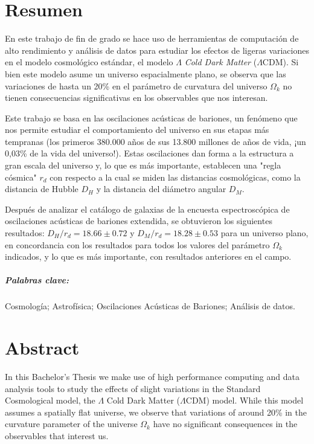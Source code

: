 \chapter*{Resumen}

En este trabajo de fin de grado se hace uso de herramientas de computación de alto rendimiento y análisis de datos para estudiar los efectos de ligeras variaciones en el modelo cosmológico estándar, el modelo $\Lambda$ \textit{Cold Dark Matter} ($\Lambda$CDM). Si bien este modelo asume un universo espacialmente plano, se observa que las variaciones de hasta un 20\% en el parámetro de curvatura del universo $\Omega_k$ no tienen consecuencias significativas en los observables que nos interesan.

Este trabajo se basa en las oscilaciones acústicas de bariones, un fenómeno que nos permite estudiar el comportamiento del universo en sus etapas más tempranas (los primeros 380.000 años de sus 13.800 millones de años de vida, ¡un 0,03\% de la vida del universo!). Estas oscilaciones dan forma a la estructura a gran escala del universo y, lo que es más importante, establecen una "regla cósmica" $r_d$ con respecto a la cual se miden las distancias cosmológicas, como la distancia de Hubble $D_H$ y la distancia del diámetro angular $D_M$.

Después de analizar el catálogo de galaxias de la encuesta espectroscópica de oscilaciones acústicas de bariones extendida, se obtuvieron los siguientes resultados: $D_H/r_d = 18.66\pm 0.72$ y $D_M/r_d = 18.28\pm 0.53$ para un universo plano, en concordancia con los resultados para todos los valores del parámetro $\Omega_k$ indicados, y lo que es más importante, con resultados anteriores en el campo.

\paragraph{Palabras clave:} Cosmología; Astrofísica; Oscilaciones Acústicas de Bariones; Análisis de datos.









\chapter*{Abstract}

In this Bachelor's Thesis we make use of high performance computing and data analysis tools to study the effects of slight variations in the Standard Cosmological model, the $\Lambda$ Cold Dark Matter ($\Lambda$CDM) model. While this model assumes a spatially flat universe, we observe that variations of around 20\% in the curvature parameter of the universe $\Omega_k$ have no significant consequences in the observables that interest us.\\


